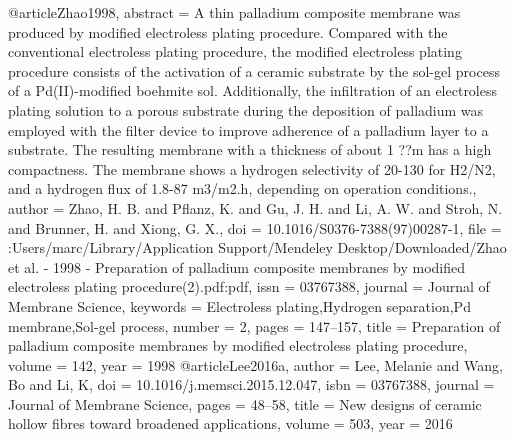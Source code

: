 @article{Zhao1998,
abstract = {A thin palladium composite membrane was produced by modified electroless plating procedure. Compared with the conventional electroless plating procedure, the modified electroless plating procedure consists of the activation of a ceramic substrate by the sol-gel process of a Pd(II)-modified boehmite sol. Additionally, the infiltration of an electroless plating solution to a porous substrate during the deposition of palladium was employed with the filter device to improve adherence of a palladium layer to a substrate. The resulting membrane with a thickness of about 1 ??m has a high compactness. The membrane shows a hydrogen selectivity of 20-130 for H2/N2, and a hydrogen flux of 1.8-87 m3/m2.h, depending on operation conditions.},
author = {Zhao, H. B. and Pflanz, K. and Gu, J. H. and Li, A. W. and Stroh, N. and Brunner, H. and Xiong, G. X.},
doi = {10.1016/S0376-7388(97)00287-1},
file = {:Users/marc/Library/Application Support/Mendeley Desktop/Downloaded/Zhao et al. - 1998 - Preparation of palladium composite membranes by modified electroless plating procedure(2).pdf:pdf},
issn = {03767388},
journal = {Journal of Membrane Science},
keywords = {Electroless plating,Hydrogen separation,Pd membrane,Sol-gel process},
number = {2},
pages = {147--157},
title = {{Preparation of palladium composite membranes by modified electroless plating procedure}},
volume = {142},
year = {1998}
}
@article{Lee2016a,
author = {Lee, Melanie and Wang, Bo and Li, K},
doi = {10.1016/j.memsci.2015.12.047},
isbn = {03767388},
journal = {Journal of Membrane Science},
pages = {48--58},
title = {{New designs of ceramic hollow fibres toward broadened applications}},
volume = {503},
year = {2016}
}
